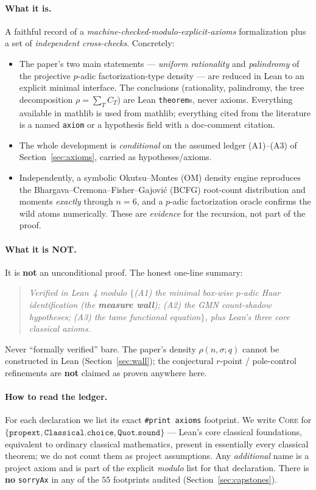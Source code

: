 \documentclass[11pt]{article}
\newcommand{\code}[1]{\texttt{#1}}
\newcommand{\modulo}{\textsl{modulo}}
\newcommand{\Core}{\textsc{Core}}
\begin{document}
\paragraph{What it is.} A faithful record of a \emph{machine-checked-\modulo{}-explicit-axioms}
formalization plus a set of \emph{independent cross-checks}. Concretely:
\begin{itemize}[leftmargin=1.4em]
\item The paper's two main statements --- \emph{uniform rationality} and \emph{palindromy}
of the projective $p$-adic factorization-type density --- are reduced in Lean to an
explicit minimal interface. The conclusions (rationality, palindromy, the tree
decomposition $\rho=\sum_T C_T$) are Lean \code{theorem}s, never axioms. Everything
available in \textsf{mathlib} is used from \textsf{mathlib}; everything cited from the
literature is a named \code{axiom} or a hypothesis field with a doc-comment citation.
\item The whole development is \emph{conditional} on the assumed ledger (A1)--(A3) of
Section~\ref{sec:axioms}, carried as hypotheses/axioms.
\item Independently, a symbolic Okutsu--Montes (OM) density engine reproduces the
Bhargava--Cremona--Fisher--Gajovi\'c (BCFG) root-count distribution and moments
\emph{exactly} through $n=6$, and a $p$-adic factorization oracle confirms the wild
atoms numerically. These are \emph{evidence} for the recursion, not part of the proof.
\end{itemize}

\paragraph{What it is NOT.} It is \textbf{not} an unconditional proof. The honest
one-line summary:
\begin{quote}
\emph{Verified in Lean~4 \modulo{} $\{$(A1) the minimal box-wise $p$-adic Haar
identification (the \textbf{measure wall}); (A2) the GMN count-shadow hypotheses; (A3)
the tame functional equation$\}$, plus Lean's three core classical axioms.}
\end{quote}
Never ``formally verified'' bare. The paper's density $\rho(n,\sigma;q)$ cannot be
constructed in Lean (Section~\ref{sec:wall}); the conjectural $r$-point / pole-control
refinements are \textbf{not} claimed as proven anywhere here.

\paragraph{How to read the ledger.} For each declaration we list its exact
\code{\#print axioms} footprint. We write \Core{} for
$\{\code{propext},\code{Classical.choice},\code{Quot.sound}\}$ --- Lean's core classical
foundations, equivalent to ordinary classical mathematics, present in essentially every
classical theorem; we do not count them as project assumptions. Any \emph{additional}
name is a project axiom and is part of the explicit \modulo{} list for that declaration.
There is \textbf{no} \code{sorryAx} in any of the $55$ footprints audited
(Section~\ref{sec:capstones}).
\end{document}
